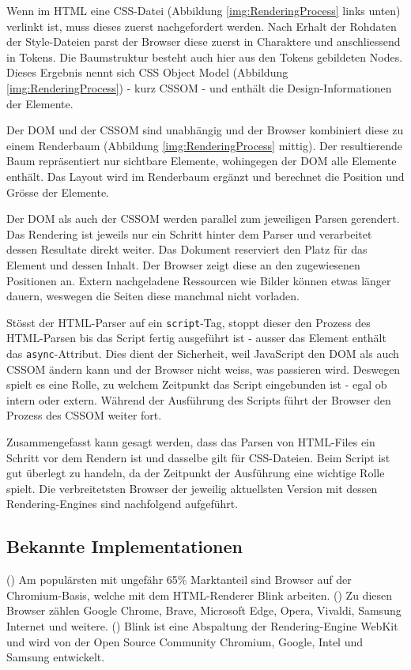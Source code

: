 Wenn im HTML eine CSS-Datei (Abbildung \ref{img:RenderingProcess} links unten) verlinkt ist, muss dieses zuerst nachgefordert werden.
Nach Erhalt der Rohdaten der Style-Dateien parst der Browser diese zuerst in Charaktere und anschliessend in Tokens.
Die Baumstruktur besteht auch hier aus den Tokens gebildeten Nodes. 
Dieses Ergebnis nennt sich CSS Object Model (Abbildung \ref{img:RenderingProcess}) - kurz CSSOM - und enthält die Design-Informationen der Elemente.

Der DOM und der CSSOM sind unabhängig und der Browser kombiniert diese zu einem Renderbaum (Abbildung \ref{img:RenderingProcess} mittig).
Der resultierende Baum repräsentiert nur sichtbare Elemente, wohingegen der DOM alle Elemente enthält.
Das Layout wird im Renderbaum ergänzt und berechnet die Position und Grösse der Elemente.

Der DOM als auch der CSSOM werden parallel zum jeweiligen Parsen gerendert.
Das Rendering ist jeweils nur ein Schritt hinter dem Parser und verarbeitet dessen Resultate direkt weiter.
Das Dokument reserviert den Platz für das Element und dessen Inhalt.
Der Browser zeigt diese an den zugewiesenen Positionen an.
Extern nachgeladene Ressourcen wie Bilder können etwas länger dauern, weswegen die Seiten diese manchmal nicht vorladen.

Stösst der HTML-Parser auf ein \texttt{script}-Tag, stoppt dieser den Prozess des HTML-Parsen bis das Script fertig ausgeführt ist - ausser das Element enthält das \texttt{async}-Attribut.
Dies dient der Sicherheit, weil JavaScript den DOM als auch CSSOM ändern kann und der Browser nicht weiss, was passieren wird.
Deswegen spielt es eine Rolle, zu welchem Zeitpunkt das Script eingebunden ist - egal ob intern oder extern. 
Während der Ausführung des Scripts führt der Browser den Prozess des CSSOM weiter fort.

Zusammengefasst kann gesagt werden, dass das Parsen von HTML-Files ein Schritt vor dem Rendern ist und dasselbe gilt für CSS-Dateien. 
Beim Script ist gut überlegt zu handeln, da der Zeitpunkt der Ausführung eine wichtige Rolle spielt.
Die verbreitetsten Browser der jeweilig aktuellsten Version mit dessen Rendering-Engines sind nachfolgend aufgeführt.


\subsection{Bekannte Implementationen}
\label{sec:implementationsRenderer}

(\cite{blinkRenderer}) Am populärsten mit ungefähr 65\% Marktanteil sind Browser auf der Chromium-Basis, welche mit dem HTML-Renderer Blink arbeiten. 
(\cite{chromiumBrowser}) Zu diesen Browser zählen Google Chrome, Brave, Microsoft Edge, Opera, Vivaldi, Samsung Internet und weitere.
(\cite{blinkRenderer}) Blink ist eine Abspaltung der Rendering-Engine WebKit und wird von der Open Source Community Chromium, Google, Intel und Samsung entwickelt.

